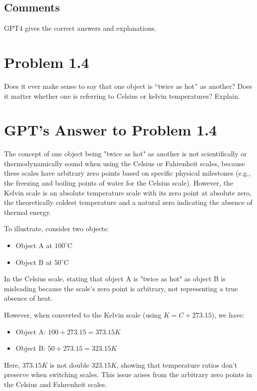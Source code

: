 \documentclass[12pt]{article}
\begin{document}
\subsection*{Comments}

GPT4 gives the correct answers and explanations.

\section*{Problem 1.4}

Does it ever make sense to say that one object is “twice as hot” as another? Does it matter whether one is referring to Celsius or kelvin temperatures? Explain.

\section*{GPT's Answer to Problem 1.4}

The concept of one object being "twice as hot" as another is not scientifically or thermodynamically sound when using the Celsius or Fahrenheit scales, because these scales have arbitrary zero points based on specific physical milestones (e.g., the freezing and boiling points of water for the Celsius scale). However, the Kelvin scale is an absolute temperature scale with its zero point at absolute zero, the theoretically coldest temperature and a natural zero indicating the absence of thermal energy.

To illustrate, consider two objects: 
\begin{itemize}
    \item Object A at $100^\circ$C
    \item Object B at $50^\circ$C
\end{itemize}

In the Celsius scale, stating that object A is "twice as hot" as object B is misleading because the scale's zero point is arbitrary, not representing a true absence of heat. 

However, when converted to the Kelvin scale (using $K = C + 273.15$), we have:
\begin{itemize}
    \item Object A: $100 + 273.15 = 373.15 K$
    \item Object B: $50 + 273.15 = 323.15 K$
\end{itemize}

Here, $373.15 K$ is not double $323.15 K$, showing that temperature ratios don't preserve when switching scales. This issue arises from the arbitrary zero points in the Celsius and Fahrenheit scales.
\end{document}
